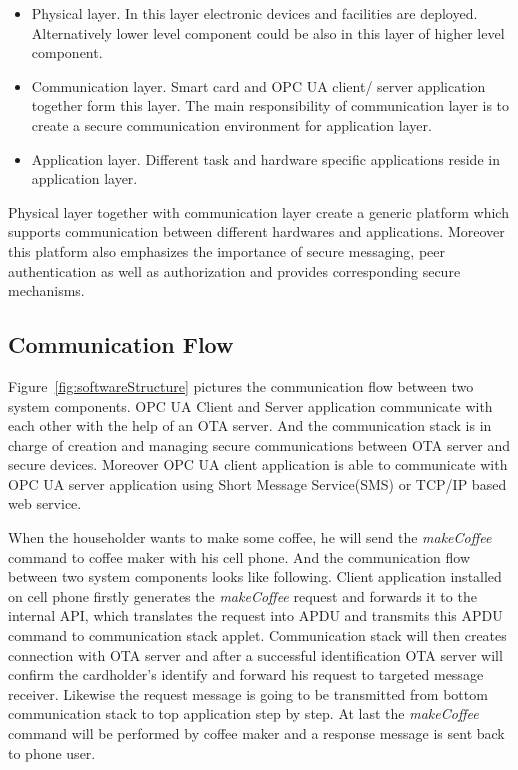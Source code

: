 \begin{itemize}
\item Physical layer. In this layer electronic devices and facilities are deployed. Alternatively lower level component could be also in this layer of higher level component.
\item Communication layer. Smart card and OPC UA client/ server application together form this layer. The main responsibility of communication layer is to create a secure communication environment for application layer.
\item Application layer. Different task and hardware specific applications reside in application layer. 
\end{itemize}

Physical layer together with communication layer create a generic platform which supports communication between different hardwares and applications. Moreover this platform also emphasizes the importance of secure messaging, peer authentication as well as authorization and provides corresponding secure mechanisms.

\subsection{Communication Flow}
Figure~\ref{fig:softwareStructure} pictures the communication flow between two system components. OPC UA Client and Server application communicate with each other with the help of an OTA server. And the communication stack is in charge of creation and managing secure communications between OTA server and secure devices. Moreover OPC UA client application is able to communicate with OPC UA server application using Short Message Service(SMS) or TCP/IP based web service. 

When the householder wants to make some coffee, he will send the \emph{makeCoffee} command to coffee maker with his cell phone. And the communication flow between two system components looks like following. Client application installed on cell phone firstly generates the \emph{makeCoffee} request and forwards it to the internal API, which translates the request into APDU and transmits this APDU command to communication stack applet. Communication stack will then creates connection with OTA server and after a successful identification OTA server will confirm the cardholder's identify and forward his request to targeted message receiver. Likewise the request message is going to be transmitted from bottom communication stack to top application step by step. At last the \emph{makeCoffee} command will be performed by coffee maker and a response message is sent back to phone user. 

